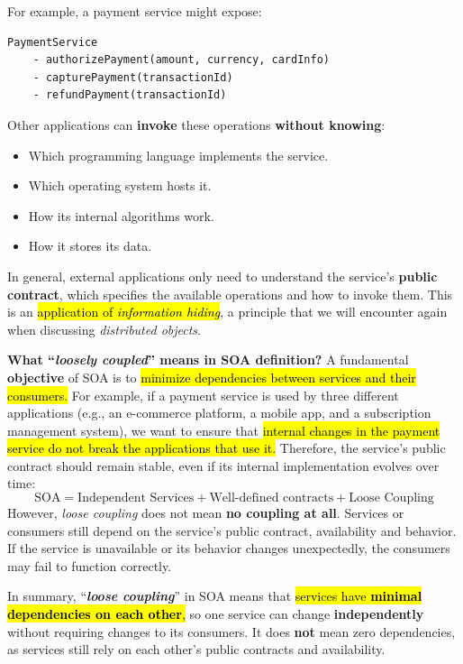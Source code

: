 \highspace
\begin{examplebox}
    For example, a payment service might expose:
\begin{lstlisting}
PaymentService
    - authorizePayment(amount, currency, cardInfo)
    - capturePayment(transactionId)
    - refundPayment(transactionId)
\end{lstlisting}
    Other applications can \textbf{invoke} these operations \textbf{without knowing}:
    \begin{itemize}
        \item Which programming language implements the service.
        \item Which operating system hosts it.
        \item How its internal algorithms work.
        \item How it stores its data.
    \end{itemize}
\end{examplebox}

\highspace
In general, external applications only need to understand the service's \textbf{public contract}, which specifies the available operations and how to invoke them. This is an \hl{application of \emph{information hiding}}, a principle that we will encounter again when discussing \emph{distributed objects}.

\highspace
\textcolor{Green3}{ \textbf{What ``\emph{loosely coupled}'' means in SOA definition?}} A fundamental \textbf{objective} of SOA is to \hl{minimize dependencies between services and their consumers.} For example, if a payment service is used by three different applications (e.g., an e-commerce platform, a mobile app, and a subscription management system), we want to ensure that \hl{internal changes in the payment service do not break the applications that use it.} Therefore, the service's public contract should remain stable, even if its internal implementation evolves over time:
\begin{equation*}
    \text{SOA} = \text{Independent Services} + \text{Well-defined contracts} + \text{Loose Coupling}
\end{equation*}
However, \emph{loose coupling} does not mean \textbf{no coupling at all}. Services or consumers still depend on the service's public contract, availability and behavior. If the service is unavailable or its behavior changes unexpectedly, the consumers may fail to function correctly.

\highspace
In summary, ``\emph{\textbf{loose coupling}}'' in SOA means that \hl{services have \textbf{minimal dependencies on each other},} so one service can change \textbf{independently} without requiring changes to its consumers. It does \textbf{not} mean zero dependencies, as services still rely on each other's public contracts and availability.

